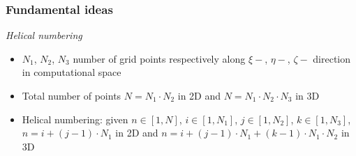 \documentclass[first,firstsupp,lastsupp,handout,last,hyperref,table]{ETHclass}
\begin{document}
\begin{frame}[t]
\frametitle{Fundamental ideas}
\vspace{-0.3cm}
\centering
 \textit{Helical numbering}
{\footnotesize
\begin{itemize}
\item $N_{1}$, $N_{2}$, $N_{3}$ number of grid points respectively along $\xi-$, $\eta-$, $\zeta-$ direction in computational space
\item Total number of points $N=N_{1}\cdotp N_{2}$ in 2D and $N=N_{1}\cdotp N_{2}\cdotp N_{3}$ in 3D
\item Helical numbering: given $n\in[1,N]$, $i\in[1,N_{1}]$, $j\in[1,N_{2}]$, $k\in[1,N_{3}]$, $n=i+(j-1)\cdotp N_{1}$ in 2D and $n=i+(j-1)\cdotp N_{1}+(k-1)\cdotp N_{1}\cdotp N_{2}$ in 3D
\end{itemize}
}
\vspace{-0.25cm}
 \begin{figure}[!h]
  \captionsetup[subfigure]{labelformat=empty}
   \centering
    \hspace{1cm}

\end{figure}
\end{frame}
\end{document}
